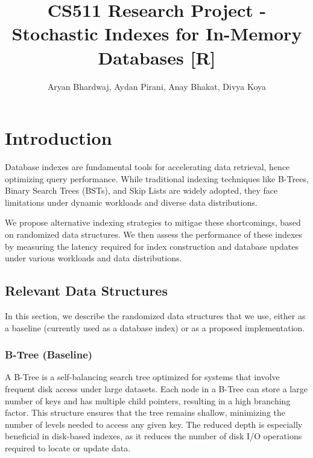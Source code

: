 \documentclass[sigconf]{acmart}
\begin{document}
\title{CS511 Research Project - Stochastic Indexes for In-Memory Databases [R]}

\author{Aryan Bhardwaj, Aydan Pirani, Anay Bhakat, Divya Koya}


\maketitle

\section{Introduction}
Database indexes are fundamental tools for accelerating data retrieval, hence optimizing query performance. While traditional indexing techniques like B-Trees, Binary Search Trees (BSTs), and Skip Lists are widely adopted, they face limitations under dynamic workloads and diverse data distributions.

We propose alternative indexing strategies to mitigae these shortcomings, based on randomized data structures. We then assess the performance of these indexes by measuring the latency required for index construction and database updates under various workloads and data distributions.

\subsection{Relevant Data Structures}
In this section, we describe the randomized data structures that we use, either as a baseline (currently used as a database index) or as a proposed implementation.

\subsubsection{B-Tree (Baseline)}
A B-Tree is a self-balancing search tree optimized for systems that involve frequent disk access under large datasets. Each node in a B-Tree can store a large number of keys and has multiple child pointers, resulting in a high branching factor. This structure ensures that the tree remains shallow, minimizing the number of levels needed to access any given key. The reduced depth is especially beneficial in disk-based indexes, as it reduces the number of disk I/O operations required to locate or update data.
\end{document}
